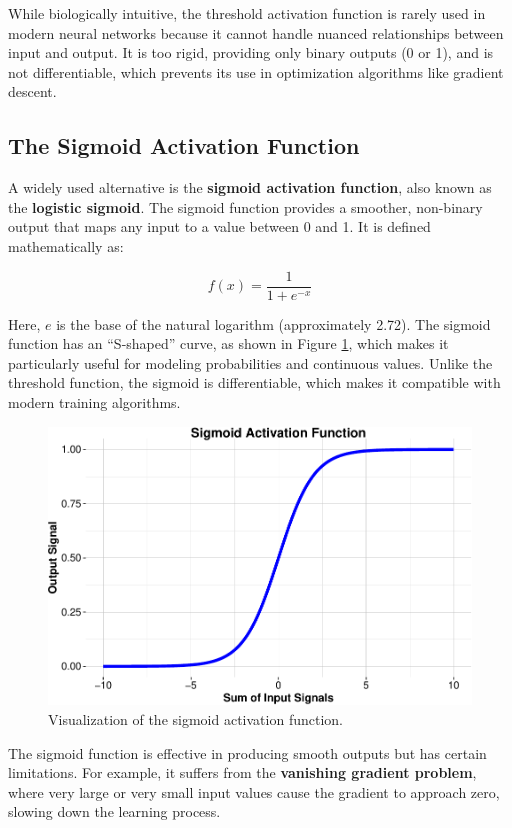 \documentclass[
]{book}
\theoremstyle{definition}
\theoremstyle{definition}
\theoremstyle{definition}
\theoremstyle{definition}
\theoremstyle{remark}
\begin{document}
While biologically intuitive, the threshold activation function is rarely used in modern neural networks because it cannot handle nuanced relationships between input and output. It is too rigid, providing only binary outputs (0 or 1), and is not differentiable, which prevents its use in optimization algorithms like gradient descent.

\subsection*{The Sigmoid Activation Function}\label{the-sigmoid-activation-function}

A widely used alternative is the \textbf{sigmoid activation function}, also known as the \textbf{logistic sigmoid}. The sigmoid function provides a smoother, non-binary output that maps any input to a value between 0 and 1. It is defined mathematically as:

\[
f(x) = \frac{1}{1 + e^{-x}}
\]

Here, \(e\) is the base of the natural logarithm (approximately 2.72). The sigmoid function has an ``S-shaped'' curve, as shown in Figure \ref{fig:active-fun-sigmoid}, which makes it particularly useful for modeling probabilities and continuous values. Unlike the threshold function, the sigmoid is differentiable, which makes it compatible with modern training algorithms.

\begin{figure}

{\centering \includegraphics[width=0.5\linewidth]{nn_files/figure-latex/active-fun-sigmoid-1} 

}

\caption{Visualization of the sigmoid activation function.}\label{fig:active-fun-sigmoid}
\end{figure}

The sigmoid function is effective in producing smooth outputs but has certain limitations. For example, it suffers from the \textbf{vanishing gradient problem}, where very large or very small input values cause the gradient to approach zero, slowing down the learning process.
\end{document}
